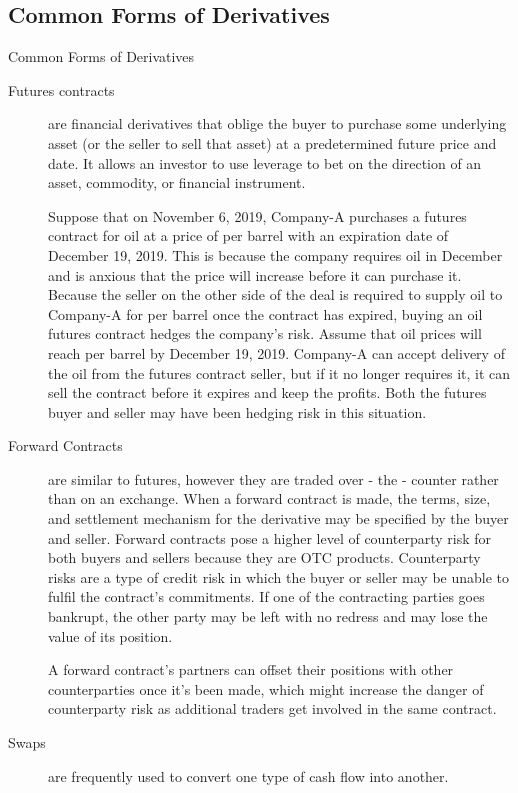 \documentclass[unknownkeysallowed, compress]{beamer}
\theoremstyle{plain}
\begin{document}
\subsection{Common Forms of Derivatives}
\begin{frame}[allowframebreaks]{Common Forms of Derivatives}
\begin{description}
\item[Futures contracts] are financial derivatives that oblige the buyer to
purchase some underlying asset (or the seller to sell that asset) at a predetermined
future price and date. It allows an investor to use leverage to bet on the direction of an
asset, commodity, or financial instrument.\\
\par Suppose that on November 6, 2019, Company-A purchases a futures contract for
oil at a price of  per barrel with an expiration date of December 19, 2019. This is
because the company requires oil in December and is anxious that the price will increase
before it can purchase it. Because the seller on the other side of the deal is required to
supply oil to Company-A for  per barrel once the contract has expired, buying an
oil futures contract hedges the company's risk. Assume that oil prices will reach  per
barrel by December 19, 2019. Company-A can accept delivery of the oil from the futures
contract seller, but if it no longer requires it, it can sell the contract before it expires and
keep the profits. Both the futures buyer and seller may have been hedging risk in this
situation.
\item[Forward Contracts] are similar to futures, however they are traded over - 
the - counter rather than on an exchange. When a forward contract is made, the terms,
size, and settlement mechanism for the derivative may be specified by the buyer and
seller. Forward contracts pose a higher level of counterparty risk for both buyers and
sellers because they are OTC products. Counterparty risks are a type of credit risk in
which the buyer or seller may be unable to fulfil the contract's commitments. If one of
the contracting parties goes bankrupt, the other party may be left with no redress and
may lose the value of its position.\\
\par A forward contract's partners can offset their positions with other counterparties
once it's been made, which might increase the danger of counterparty risk as additional
traders get involved in the same contract.
\item[Swaps] are frequently used to convert one type of cash flow into another.

\end{description}
\end{frame}
\end{document}
